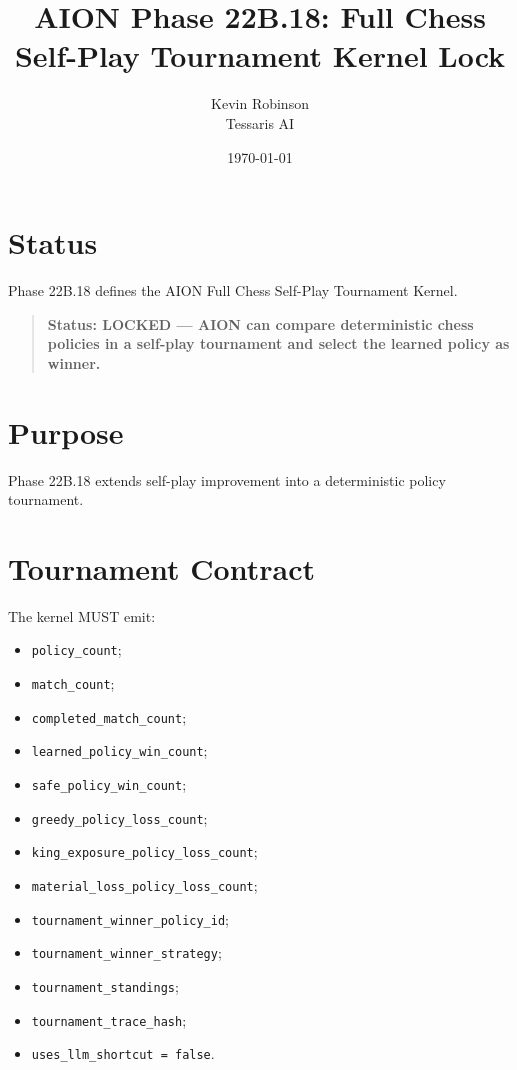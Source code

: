 \documentclass[11pt,a4paper]{article}
\title{\textbf{AION Phase 22B.18: Full Chess Self-Play Tournament Kernel Lock}}
\author{Kevin Robinson\\Tessaris AI}
\date{\today}
\begin{document}
\maketitle

\section{Status}

Phase 22B.18 defines the AION Full Chess Self-Play Tournament Kernel.

\begin{quote}
\textbf{Status: LOCKED --- AION can compare deterministic chess policies in a self-play tournament and select the learned policy as winner.}
\end{quote}

\section{Purpose}

Phase 22B.18 extends self-play improvement into a deterministic policy tournament.

\section{Tournament Contract}

The kernel MUST emit:

\begin{itemize}
  \item \texttt{policy\_count};
  \item \texttt{match\_count};
  \item \texttt{completed\_match\_count};
  \item \texttt{learned\_policy\_win\_count};
  \item \texttt{safe\_policy\_win\_count};
  \item \texttt{greedy\_policy\_loss\_count};
  \item \texttt{king\_exposure\_policy\_loss\_count};
  \item \texttt{material\_loss\_policy\_loss\_count};
  \item \texttt{tournament\_winner\_policy\_id};
  \item \texttt{tournament\_winner\_strategy};
  \item \texttt{tournament\_standings};
  \item \texttt{tournament\_trace\_hash};
  \item \texttt{uses\_llm\_shortcut = false}.
\end{itemize}
\end{document}
